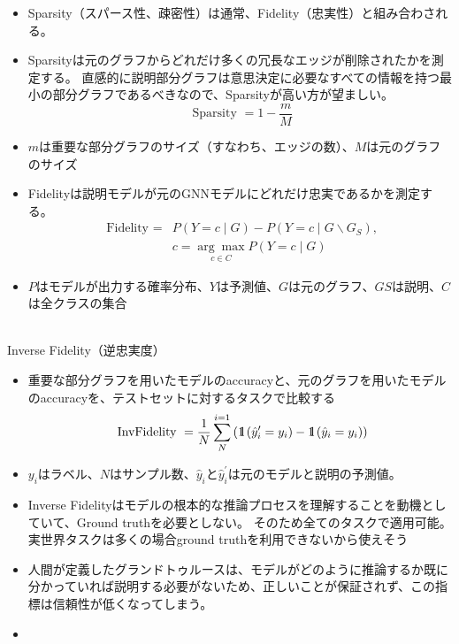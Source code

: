 \documentclass[a4paper,10pt]{ltjsarticle}
\newcommand{\1}{\mbox{1}\hspace{-0.25em}\mbox{l}}
\theoremstyle{definition}
\begin{document}
    \begin{itemize}
        \item Sparsity（スパース性、疎密性）は通常、Fidelity（忠実性）と組み合わされる。
        \item Sparsityは元のグラフからどれだけ多くの冗長なエッジが削除されたかを測定する。
        直感的に説明部分グラフは意思決定に必要なすべての情報を持つ最小の部分グラフであるべきなので、Sparsityが高い方が望ましい。
        \begin{equation}
            \text { Sparsity }=1-\frac{m}{M}
        \end{equation}
        \item $m$は重要な部分グラフのサイズ（すなわち、エッジの数）、$M$は元のグラフのサイズ
        \item Fidelityは説明モデルが元のGNNモデルにどれだけ忠実であるかを測定する。
        \begin{equation}
            \begin{aligned}
                \text { Fidelity }=& P(Y=c \mid G)-P\left(Y=c \mid G \backslash G_{S}\right), \\
                & c=\underset{c \in C}{\arg \max } P(Y=c \mid G)
            \end{aligned}
        \end{equation}
        \item $P$はモデルが出力する確率分布、$Y$は予測値、$G$は元のグラフ、$GS$は説明、$C$は全クラスの集合
    \end{itemize}

    \\
    Inverse Fidelity（逆忠実度）\cite{schlichtkrull2020interpreting}
    \begin{itemize}
        \item 重要な部分グラフを用いたモデルのaccuracyと、元のグラフを用いたモデルのaccuracyを、テストセットに対するタスクで比較する
        \begin{equation}
            \text { InvFidelity }=\frac{1}{N} \sum_{N}^{i=1}\left( \1\left(\hat{y}_{i}^{\prime}=y_{i}\right)-\1\left(\hat{y}_{i}=y_{i}\right)\right)
        \end{equation}
        \item $y_i$はラベル、$N$はサンプル数、$\hat{y}_i$と$\hat{y}_i^\prime$は元のモデルと説明の予測値。
        \item Inverse Fidelityはモデルの根本的な推論プロセスを理解することを動機としていて、Ground truthを必要としない。
        そのため全てのタスクで適用可能。実世界タスクは多くの場合ground truthを利用できないから使えそう
        \item 人間が定義したグランドトゥルースは、モデルがどのように推論するか既に分かっていれば説明する必要がないため、正しいことが保証されず、この指標は信頼性が低くなってしまう。
        \item
    \end{itemize}
\end{document}
